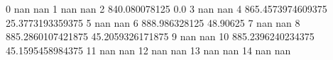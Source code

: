 0 nan nan
1 nan nan
2 840.080078125 0.0
3 nan nan
4 865.4573974609375 25.3773193359375
5 nan nan
6 888.986328125 48.90625
7 nan nan
8 885.2860107421875 45.2059326171875
9 nan nan
10 885.2396240234375 45.1595458984375
11 nan nan
12 nan nan
13 nan nan
14 nan nan
